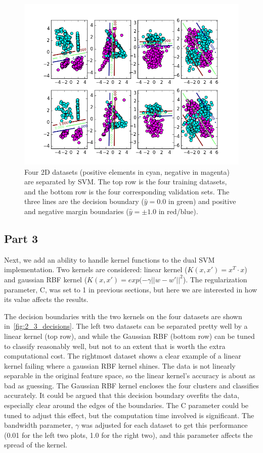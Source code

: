 \begin{figure}
	\centering
	\includegraphics [trim=0 0 0 0, clip, angle=0, width=0.8\columnwidth,
	keepaspectratio]{figures/2_2_decisions}
	\caption{Four 2D datasets (positive elements in cyan, negative in magenta) are separated by SVM. The top row is the four training datasets, and the bottom row is the four corresponding validation sets.
	The three lines are the decision boundary ($\hat{y}=0.0$ in green) and positive and negative margin boundaries ($\hat{y}=\pm1.0$ in red/blue).}
	\label{fig:2_2_decisions} 
\end{figure}

\subsection{Part 3}
Next, we add an ability to handle kernel functions to the dual SVM implementation.
Two kernels are considered: linear kernel ($K(x,x')=x^T\cdot x$) and gaussian RBF kernel ($K(x,x')=exp(-\gamma||w-w'||^2$).
The regularization parameter, C, was set to 1 in previous sections, but here we are interested in how its value affects the results.

The decision boundaries with the two kernels on the four datasets are shown in~\cref{fig:2_3_decisions}.
The left two datasets can be separated pretty well by a linear kernel (top row), and while the Gaussian RBF (bottom row) can be tuned to classify reasonably well, but not to an extent that is worth the extra computational cost.
The rightmost dataset shows a clear example of a linear kernel failing where a gaussian RBF kernel shines.
The data is not linearly separable in the original feature space, so the linear kernel's accuracy is about as bad as guessing.
The Gaussian RBF kernel encloses the four clusters and classifies accurately.
It could be argued that this decision boundary overfits the data, especially clear around the edges of the boundaries.
The C parameter could be tuned to adjust this effect, but the computation time involved is significant.
The bandwidth parameter, $\gamma$ was adjusted for each dataset to get this performance (0.01 for the left two plots, 1.0 for the right two), and this parameter affects the spread of the kernel.


